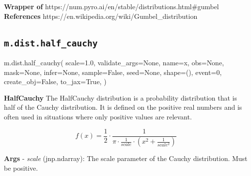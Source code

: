 \documentclass[
  letterpaper,
  DIV=11,
  numbers=noendperiod]{scrartcl}
\newenvironment{Shaded}{\begin{snugshade}}{\end{snugshade}}
\newcommand{\DecValTok}[1]{\textcolor[rgb]{0.68,0.00,0.00}{#1}}
\newcommand{\FloatTok}[1]{\textcolor[rgb]{0.68,0.00,0.00}{#1}}
\newcommand{\NormalTok}[1]{\textcolor[rgb]{0.00,0.23,0.31}{#1}}
\newcommand{\OperatorTok}[1]{\textcolor[rgb]{0.37,0.37,0.37}{#1}}
\newcommand{\StringTok}[1]{\textcolor[rgb]{0.13,0.47,0.30}{#1}}
\newcommand{\VariableTok}[1]{\textcolor[rgb]{0.07,0.07,0.07}{#1}}
\begin{document}
\textbf{Wrapper of}
https://num.pyro.ai/en/stable/distributions.html\#gumbel
\textbf{References} https://en.wikipedia.org/wiki/Gumbel\_distribution

\subsection{\texorpdfstring{\texttt{m.dist.half\_cauchy}}{m.dist.half\_cauchy}}\label{half_cauchy}

\begin{Shaded}
\begin{Highlighting}[]
\NormalTok{m.dist.half\_cauchy(}
\NormalTok{    scale}\OperatorTok{=}\FloatTok{1.0}\NormalTok{,}
\NormalTok{    validate\_args}\OperatorTok{=}\VariableTok{None}\NormalTok{,}
\NormalTok{    name}\OperatorTok{=}\StringTok{\textquotesingle{}x\textquotesingle{}}\NormalTok{,}
\NormalTok{    obs}\OperatorTok{=}\VariableTok{None}\NormalTok{,}
\NormalTok{    mask}\OperatorTok{=}\VariableTok{None}\NormalTok{,}
\NormalTok{    infer}\OperatorTok{=}\VariableTok{None}\NormalTok{,}
\NormalTok{    sample}\OperatorTok{=}\VariableTok{False}\NormalTok{,}
\NormalTok{    seed}\OperatorTok{=}\VariableTok{None}\NormalTok{,}
\NormalTok{    shape}\OperatorTok{=}\NormalTok{(),}
\NormalTok{    event}\OperatorTok{=}\DecValTok{0}\NormalTok{,}
\NormalTok{    create\_obj}\OperatorTok{=}\VariableTok{False}\NormalTok{,}
\NormalTok{    to\_jax}\OperatorTok{=}\VariableTok{True}\NormalTok{,}
\NormalTok{)}
\end{Highlighting}
\end{Shaded}

\textbf{HalfCauchy} The HalfCauchy distribution is a probability
distribution that is half of the Cauchy distribution. It is defined on
the positive real numbers and is often used in situations where only
positive values are relevant.

\[   
  f(x) = \frac{1}{2} \cdot \frac{1}{\pi \cdot \frac{1}{scale} \cdot (x^2 + \frac{1}{scale^2})}
  \]

\textbf{Args} - \emph{scale} (jnp.ndarray): The scale parameter of the
Cauchy distribution. Must be positive.
\end{document}
